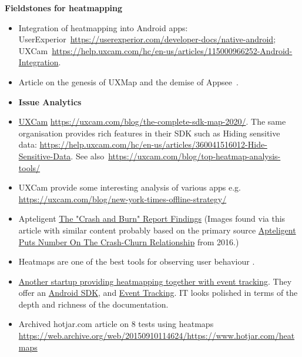 \textbf{Fieldstones for heatmapping} 
\begin{itemize}
    \item Integration of heatmapping into Android apps: UserExperior~\url{https://userexperior.com/developer-docs/native-android}; UXCam~\url{https://help.uxcam.com/hc/en-us/articles/115000966252-Android-Integration}.
    \item Article on the genesis of UXMap and the demise of Appsee~\citep{uxcam_hackermoon_2020_heatmapping}.
    \item \textbf{Issue Analytics} 
    \item \href{https://uxcam.com/}{UXCam} \url{https://uxcam.com/blog/the-complete-sdk-map-2020/}. The same organisation provides rich features in their SDK such as Hiding sensitive data: \url{https://help.uxcam.com/hc/en-us/articles/360041516012-Hide-Sensitive-Data}. See also~\url{https://uxcam.com/blog/top-heatmap-analysis-tools/}
    \item UXCam provide some interesting analysis of various apps e.g. \url{https://uxcam.com/blog/new-york-times-offline-strategy/}
    \item Apteligent \href{https://www.apmdigest.com/the-crash-and-burn-report-findings}{The "Crash and Burn" Report Findings} (Images found via this article with similar content probably based on the primary source \href{https://www.androidheadlines.com/2016/12/apteligent-puts-number-crash-churn-relationship.html}{Apteligent Puts Number On The Crash-Churn Relationship} from 2016.)
    \item Heatmaps are one of the best tools for observing user behaviour \citep{inapptics2017_mobile_heatmap_visualise_user_behaviour}.
    \item \href{https://www.smartlook.com/mobile-analytics/}{Another startup providing heatmapping together with event tracking}. They offer an \href{https://smartlook.github.io/docs/sdk/android?platform=android}{Android SDK}, and \href{https://smartlook.github.io/docs/sdk/conceptual/event-tracking?platform=android}{Event Tracking}. IT looks polished in terms of the depth and richness of the documentation.
    \item Archived hotjar.com article on 8 tests using heatmaps \url{https://web.archive.org/web/20150910114624/https://www.hotjar.com/heatmaps}

\end{itemize}

